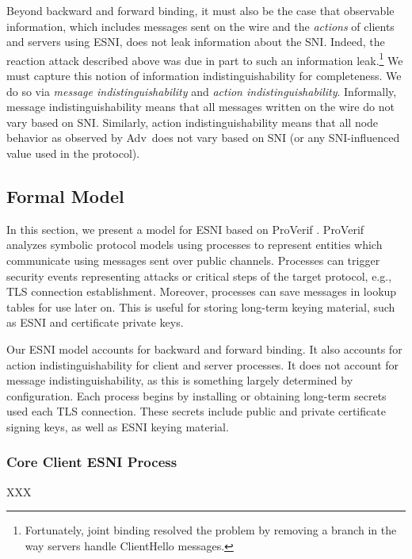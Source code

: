 \documentclass[twoside]{article}
\newcommand{\adv}{{\sf Adv}}
\theoremstyle{definition}
\begin{document}
Beyond backward and forward binding, it must also be the case that observable information, which includes 
messages sent on the wire and the \emph{actions} of clients and servers using ESNI, does not leak information
about the SNI. Indeed, the reaction attack described above was due in part to such an information 
leak.\footnote{Fortunately, joint binding resolved the problem by removing a branch in the way servers
handle ClientHello messages.} We must capture this notion of information indistinguishability for completeness.
We do so via \emph{message indistinguishability} and \emph{action indistinguishability}. Informally, message 
indistinguishability means that all messages written on the wire do not vary based on SNI. Similarly, action
indistinguishability means that all node behavior as observed by \adv\ does not vary based on SNI (or any SNI-influenced
value used in the protocol).


\subsection{Formal Model}

In this section, we present a model for ESNI based on ProVerif \cite{28,32}. ProVerif analyzes symbolic protocol
models using processes to represent entities which communicate using messages sent over public channels. Processes
can trigger security events representing attacks or critical steps of the target protocol, e.g., TLS connection establishment.
Moreover, processes can save messages in lookup tables for use later on. This is useful for storing long-term keying
material, such as ESNI and certificate private keys. 

Our ESNI model accounts for backward and forward binding. It also accounts for action indistinguishability for client
and server processes. It does not account for message indistinguishability, as this is something largely determined
by configuration. Each process begins by installing or obtaining long-term secrets used each TLS connection. These secrets
include public and private certificate signing keys, as well as ESNI keying material.

\subsubsection{Core Client ESNI Process}
XXX
\end{document}
